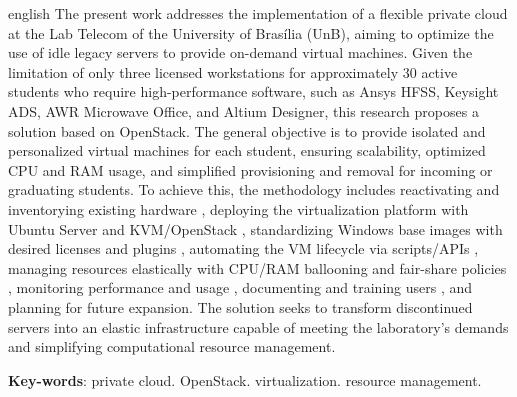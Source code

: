 \begin{resumo}[Abstract]
 \begin{otherlanguage*}{english}
  The present work addresses the implementation of a flexible private cloud at the Lab Telecom of the University of Brasília (UnB), aiming to optimize the use of idle legacy servers to provide on-demand virtual machines. Given the limitation of only three licensed workstations for approximately 30 active students who require high-performance software, such as Ansys HFSS, Keysight ADS, AWR Microwave Office, and Altium Designer, this research proposes a solution based on OpenStack. The general objective is to provide isolated and personalized virtual machines for each student, ensuring scalability, optimized CPU and RAM usage, and simplified provisioning and removal for incoming or graduating students. To achieve this, the methodology includes reactivating and inventorying existing hardware , deploying the virtualization platform with Ubuntu Server and KVM/OpenStack , standardizing Windows base images with desired licenses and plugins , automating the VM lifecycle via scripts/APIs , managing resources elastically with CPU/RAM ballooning and fair-share policies , monitoring performance and usage , documenting and training users , and planning for future expansion. The solution seeks to transform discontinued servers into an elastic infrastructure capable of meeting the laboratory's demands and simplifying computational resource management.

   \vspace{\onelineskip}
 
   \noindent 
   \textbf{Key-words}: private cloud. OpenStack. virtualization. resource management.
 \end{otherlanguage*}
\end{resumo}
